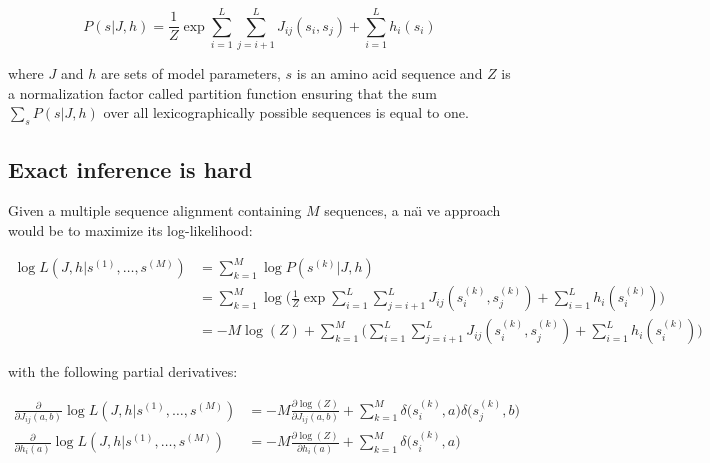         \begin{equation}
            P(s \vert J, h) = \frac{1}{Z} \exp{\sum\limits_{i=1}^L \sum\limits_{j=i+1}^L J_{ij}(s_i, s_j) + \sum\limits_{i=1}^L h_i(s_i)}
        \end{equation}

        where $J$ and $h$ are sets of model parameters, $s$ is an amino acid sequence and
        $Z$ is a normalization factor called partition function ensuring
        that the sum $\sum_s P(s \vert J, h)$ over all lexicographically
        possible sequences is equal to one.

    \subsection{Exact inference is hard}

        Given a multiple sequence alignment containing $M$ sequences, a na\"\i
        ve approach would be to maximize its log-likelihood:

        \begin{equation}
            \begin{split}
                \log{L}(J, h \vert s^{(1)}, \dotsc, s^{(M)}) & = \sum\limits_{k=1}^M \log P(s^{(k)} \vert J, h) \\
                & = \sum\limits_{k=1}^M \log \Bigg( \frac{1}{Z} \exp{\sum\limits_{i=1}^L
                    \sum\limits_{j=i+1}^L J_{ij}(s_i^{(k)}, s_j^{(k)}) + \sum\limits_{i=1}^L h_i(s_i^{(k)})} \Bigg) \\
                & = -M \log(Z) + \sum\limits_{k=1}^M \Big( \sum\limits_{i=1}^L \sum\limits_{j=i+1}^L J_{ij}(s_i^{(k)}, s_j^{(k)})
                    + \sum\limits_{i=1}^L h_i(s_i^{(k)}) \Big)
            \end{split}
        \end{equation}

        with the following partial derivatives:

        \begin{equation}
            \begin{split}
                \frac{\partial}{\partial J_{ij}(a, b)} \log{L}(J, h \vert s^{(1)}, \dotsc, s^{(M)}) & =
                    -M \frac{\partial \log(Z)}{\partial J_{ij}(a, b)} + \sum\limits_{k=1}^M \delta\Big(s_i^{(k)}, a\Big) \delta\Big(s_j^{(k)}, b\Big) \\
                 \frac{\partial}{\partial h_{i}(a)} \log{L}(J, h \vert s^{(1)}, \dotsc, s^{(M)}) & =
                    -M \frac{\partial \log(Z)}{\partial h_{i}(a)} + \sum\limits_{k=1}^M \delta\Big(s_i^{(k)}, a\Big)
            \end{split}
        \end{equation}

